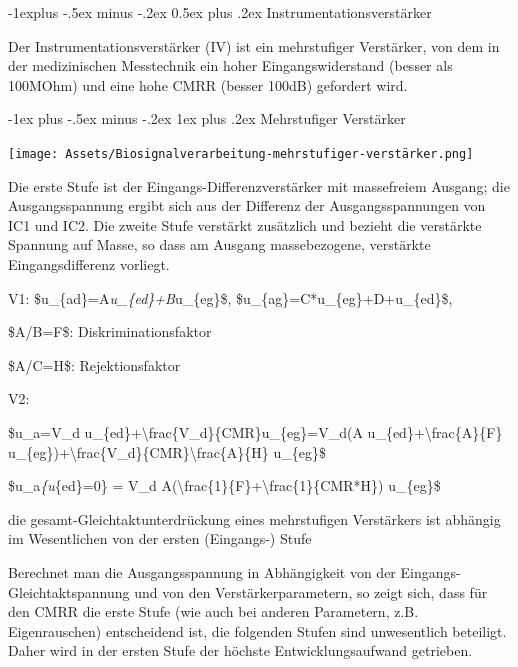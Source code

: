 \documentclass[a4paper]{article}
\makeatletter
\renewcommand{\subsection}{\@startsection{subsection}{2}{0mm}%
 {-1explus -.5ex minus -.2ex}%
 {0.5ex plus .2ex}%
 {\normalfont\normalsize\bfseries}}
\renewcommand{\subsubsection}{\@startsection{subsubsection}{3}{0mm}%
 {-1ex plus -.5ex minus -.2ex}%
 {1ex plus .2ex}%
 {\normalfont\small\bfseries}}
\makeatother
\begin{document}
\begin{multicols}{3}
  \subsection{Instrumentationsverstärker}\label{instrumentationsverstuxe4rker}

  Der Instrumentationsverstärker (IV) ist ein mehrstufiger Verstärker, von
  dem in der medizinischen Messtechnik ein hoher Eingangswiderstand
  (besser als 100MOhm) und eine hohe CMRR (besser 100dB) gefordert wird.

  \subsubsection{Mehrstufiger Verstärker}\label{mehrstufiger-verstuxe4rker}

  \begin{itemize*}
    \item \texttt{[image: Assets/Biosignalverarbeitung-mehrstufiger-verstärker.png]}
    \item Die erste Stufe ist der Eingangs-Differenzverstärker mit massefreiem Ausgang; die Ausgangsspannung ergibt sich aus der Differenz der Ausgangsspannungen von IC1 und IC2. Die zweite Stufe verstärkt zusätzlich und bezieht die verstärkte Spannung auf Masse, so dass am Ausgang massebezogene, verstärkte Eingangsdifferenz vorliegt.
    \item V1: \$u\_\{ad\}=A\emph{u\_\{ed\}+B}u\_\{eg\}\$, \$u\_\{ag\}=C*u\_\{eg\}+D+u\_\{ed\}\$,
    \begin{itemize*} \item \$A/B=F\$: Diskriminationsfaktor \item \$A/C=H\$: Rejektionsfaktor  \end{itemize*}
    \item V2:
    \begin{itemize*} \item \$u\_a=V\_d u\_\{ed\}+\textbackslash frac\{V\_d\}\{CMR\}u\_\{eg\}=V\_d(A u\_\{ed\}+\textbackslash frac\{A\}\{F\} u\_\{eg\})+\textbackslash frac\{V\_d\}\{CMR\}\textbackslash frac\{A\}\{H\} u\_\{eg\}\$ \item \$u\_a\textbar{}\emph{\{u}\{ed\}=0\} = V\_d A(\textbackslash frac\{1\}\{F\}+\textbackslash frac\{1\}\{CMR*H\}) u\_\{eg\}\$ \item die gesamt-Gleichtaktunterdrückung eines mehrstufigen Verstärkers ist abhängig im Wesentlichen von der ersten (Eingangs-) Stufe  \end{itemize*}
    \item Berechnet man die Ausgangsspannung in Abhängigkeit von der Eingangs-Gleichtaktspannung und von den Verstärkerparametern, so zeigt sich, dass für den CMRR die erste Stufe (wie auch bei anderen Parametern, z.B. Eigenrauschen) entscheidend ist, die folgenden Stufen sind unwesentlich beteiligt. Daher wird in der ersten Stufe der höchste Entwicklungsaufwand getrieben.
  \end{itemize*}


\end{multicols}
\end{document}
